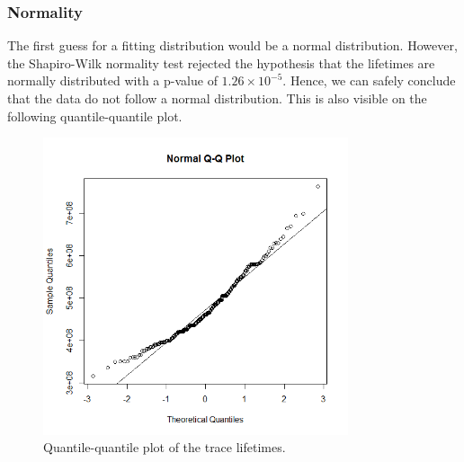 \subsubsection{Normality}
The first guess for a fitting distribution would be a normal distribution. However, the Shapiro-Wilk normality test rejected the hypothesis that the lifetimes are normally distributed with a p-value of $1.26\times 10^{-5}$. Hence, we can safely conclude that the data do not follow a normal distribution. This is also visible on the following quantile-quantile plot.
\begin{figure}[H]
\centering
\includegraphics[width=0.8\textwidth]{Plots/QQPlot.png}
\caption{Quantile-quantile plot of the trace lifetimes.}
\end{figure}

